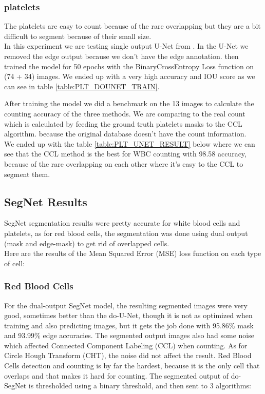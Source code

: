 \documentclass[conference]{IEEEtran}
\begin{document}
\subsubsection{platelets}
\hspace{\parindent}
The platelets are easy to count because of the rare overlapping but they are a bit difficult to segment because of their small size.\\
In this experiment we are testing single output U-Net from \cite{10.1007/978-3-030-44584-3_31}. In the U-Net we removed the edge output because we don’t have the edge annotation.
then trained the model for 50 epochs with the BinaryCrossEntropy Loss function on (74 + 34) images.
We ended up with a very high accuracy and IOU score as we can see in table \ref{table:PLT_DOUNET_TRAIN}.

After training the model we did a benchmark on the 13 images to calculate the counting accuracy of the three methods.
We are comparing to the real count which is calculated by feeding the ground truth platelets masks to the CCL algorithm. because the original database doesn't have the count information.\\
We ended up with the table \ref{table:PLT_UNET_RESULT} below where we can see that the CCL method is the best for WBC counting with 98.58 accuracy, because of the rare overlapping on each other where it’s easy to the CCL to segment them.

\subsection{SegNet Results}
\hspace{\parindent}
SegNet segmentation results were pretty accurate for white blood cells and platelets, as for red blood cells, the segmentation was done using dual output (mask and edge-mask) to get rid of overlapped cells.\\
Here are the results of the Mean Squared Error (MSE) loss function on each type of cell:


\subsubsection{Red Blood Cells}
\hspace{\parindent}
For the dual-output SegNet model, the resulting segmented images were very good, sometimes better than the do-U-Net, though it is not as optimized when training and also predicting images, but it gets the job done with 95.86\% mask and 93.99\% edge accuracies. The segmented output images also had some noise which affected Connected Component Labeling (CCL) when counting.
As for Circle Hough Transform (CHT), the noise did not affect the result.
Red Blood Cells detection and counting is by far the hardest, because it is the only cell that overlaps and that makes it hard for counting.
The segmented output of do-SegNet is thresholded using a binary threshold, and then sent to 3 algorithms:
\end{document}
